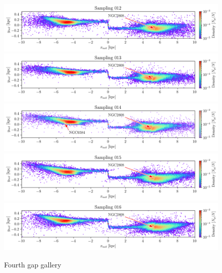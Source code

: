 \documentclass[draft]{aa}
\begin{document}
\begin{appendix}
    \begin{figure}
      \centering
      \includegraphics[width=\linewidth]{gallery_of_gaps_monte-carlo-012.png}
      \includegraphics[width=\linewidth]{gallery_of_gaps_monte-carlo-013.png}
      \includegraphics[width=\linewidth]{gallery_of_gaps_monte-carlo-014.png}      
      \includegraphics[width=\linewidth]{gallery_of_gaps_monte-carlo-015.png}
      \includegraphics[width=\linewidth]{gallery_of_gaps_monte-carlo-016.png}
      \caption{Fourth gap gallery}
      \label{fig:gallery3}
      \end{figure}        


\end{appendix}
\end{document}
